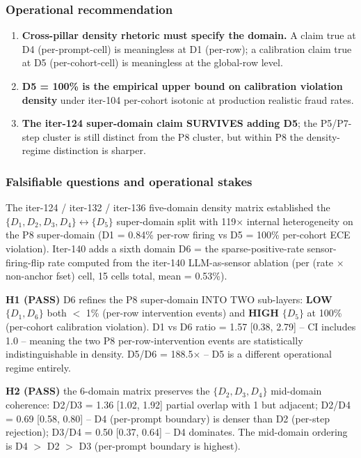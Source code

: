 \documentclass{article}
\begin{document}
\subsubsection{Operational recommendation}

\begin{enumerate}
\item \textbf{Cross-pillar density rhetoric must specify the domain.} A claim true at D4
      (per-prompt-cell) is meaningless at D1 (per-row); a calibration claim true at D5
      (per-cohort-cell) is meaningless at the global-row level.
\item \textbf{D5 = 100\% is the empirical upper bound on calibration violation density}
      under iter-104 per-cohort isotonic at production realistic fraud rates.
\item \textbf{The iter-124 super-domain claim SURVIVES adding D5}; the P5/P7-step cluster
      is still distinct from the P8 cluster, but within P8 the density-regime distinction is sharper.
\end{enumerate}
 

\subsubsection{Falsifiable questions and operational stakes}
The iter-124 / iter-132 / iter-136 five-domain density matrix
established the $\{D_1, D_2, D_3, D_4\} \leftrightarrow \{D_5\}$
super-domain split with 119$\times$ internal heterogeneity on
the P8 super-domain (D1 = 0.84\% per-row firing vs D5 = 100\%
per-cohort ECE violation).  Iter-140 adds a sixth domain D6 = the
sparse-positive-rate sensor-firing-flip rate computed from the
iter-140 LLM-as-sensor ablation (per (rate $\times$ non-anchor
fset) cell, 15 cells total, mean = 0.53\%).

\textbf{H1 (PASS)} D6 refines the P8 super-domain INTO TWO sub-layers:
\textbf{LOW} $\{D_1, D_6\}$ both $<$ 1\% (per-row intervention events) and
\textbf{HIGH} $\{D_5\}$ at 100\% (per-cohort calibration violation).
D1 vs D6 ratio = 1.57 [0.38, 2.79] -- CI includes 1.0 -- meaning the
two P8 per-row-intervention events are statistically indistinguishable
in density.  D5/D6 = 188.5$\times$ -- D5 is a different operational
regime entirely.

\textbf{H2 (PASS)} the 6-domain matrix preserves the $\{D_2, D_3, D_4\}$
mid-domain coherence: D2/D3 = 1.36 [1.02, 1.92] partial overlap with 1
but adjacent; D2/D4 = 0.69 [0.58, 0.80] -- D4 (per-prompt boundary) is
denser than D2 (per-step rejection); D3/D4 = 0.50 [0.37, 0.64] --
D4 dominates.  The mid-domain ordering is D4 $>$ D2 $>$ D3 (per-prompt
boundary is highest).
\end{document}
